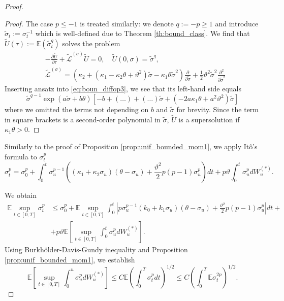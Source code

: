 \documentclass[pdftex,11pt,a4paper] {article}
\begin{document}
\begin{proof}
\begin{proof}
The case $p\le -1$ is treated similarly: we denote $q:=-p\ge 1$ and introduce $\tilde\sigma_t:=\sigma_t^{-1}$ which is well-defined due to Theorem \ref{th:bound_class}. 
We find that 
$\tilde U(\tau):=\mathbb{E}(\tilde \sigma_t^q)$  solves the problem
\begin{equation}\label{eq:boun_diffop3}
\begin{split}
&-\frac{\partial \tilde U}{\partial \tau}+\tilde{\mathcal{L}}^{(\sigma)}\tilde U=0,\quad  \tilde U(0,\sigma)=\tilde\sigma^q,\\
&\tilde{\mathcal{L}}^{(\sigma)}=\left(\kappa_2+(\kappa_1-\kappa_2\theta+\vartheta^2)\tilde\sigma-\kappa_1\theta\tilde\sigma^2\right)\frac{\partial}{\partial \tilde\sigma}+\frac 12\vartheta^2\tilde\sigma^2\frac{\partial^2}{\partial \tilde\sigma^2}
\end{split}
\end{equation}
Inserting ansatz into \eqref{eq:boun_diffop3}, we see that its left-hand side equals
\begin{equation*}
\tilde\sigma^{q-1}\exp(a\tilde\sigma+b\theta)\left[-b+(\ldots)+(\ldots)\tilde\sigma+(-2a\kappa_1\theta+a^2\vartheta^2)\tilde\sigma\right]
\end{equation*}
where we omitted the terms not depending on $b$ and $\tilde\sigma$ for brevity. 
Since the term in square brackets is a second-order polynomial in $\tilde \sigma$, $ \tilde{U}$ is a supersolution if $\kappa_1\theta>0$. 
\end{proof}


Similarly to the proof of Proposition \ref{prop:unif_bounded_mom1}, we apply It\^{o}'s formula to $\sigma_t^p$
\begin{equation*}
\sigma_t^p=\sigma_0^p+\int_0^t\sigma_u^{p-1}\left((\kappa_1+\kappa_2\sigma_u)(\theta-\sigma_u) + \frac{\vartheta^2}{2}p(p-1)\sigma_u^p\right)dt+p\vartheta\int_0^t\sigma_u^{p}dW_u^{(*)}.
\end{equation*}

We obtain
\begin{equation*}
\begin{split}
\mathbb{E}\sup_{t\in[0,T]}\sigma_t^p %
& \le 
\sigma_0^p+\mathbb{E}\sup_{t\in[0,T]}\int_0^t\left|p\sigma_u^{p-1}(k_0+k_1\sigma_u)(\theta-\sigma_u)+\frac{\vartheta^2}{2}p(p-1)\sigma_u^p\right|dt+\\
&+p\vartheta\mathbb{E}\left[\sup_{t\in[0,T]}\int_0^t\sigma_u^pdW_u^{(*)}\right].
\end{split}
\end{equation*}
Using Burkh\"{o}lder-Davis-Gundy inequality and Proposition \ref{prop:unif_bounded_mom1}, we establish
\begin{equation*}
\mathbb{E}\left[\sup_{t\in[0,T]}\int_0^u\sigma_u^pdW_u^{(*)}\right]\le C\mathbb{E}\left(\int_0^T\sigma_t^pdt\right)^{1/2}\le
C\left(\int_0^T\mathbb{E}\sigma_t^{2p}\right)^{1/2}.
\end{equation*}

\end{proof}
\end{document}
